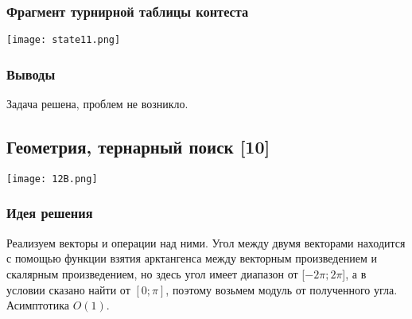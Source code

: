 \documentclass[12pt]{article}
\begin{document}
\subsubsection*{Фрагмент турнирной таблицы контеста}
\begin{center}
\texttt{[image: state11.png]}\newline\noindent
\end{center}

\subsubsection*{Выводы}
Задача решена, проблем не возникло.
\subsection*{Геометрия, тернарный поиск [10]}
\begin{center}
\texttt{[image: 12B.png]}
\end{center}
\subsubsection*{Идея решения}
Реализуем векторы и операции над ними. Угол между двумя векторами находится с помощью функции взятия арктангенса между векторным произведением и скалярным произведением, но здесь угол имеет диапазон от [$-2\pi; 2\pi$], а в условии сказано найти от $[0; \pi]$, поэтому возьмем модуль от полученного угла. Асимптотика $O(1)$.
\end{document}
